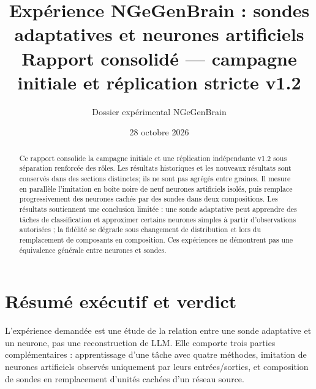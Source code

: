 \documentclass[11pt,a4paper]{article}
\title{\vspace{-1cm}\textcolor{blueNG}{\bfseries Expérience NGeGenBrain : sondes adaptatives et neurones artificiels}\\[.2em]\large Rapport consolidé — campagne initiale et réplication stricte v1.2}
\author{Dossier expérimental NGeGenBrain}
\date{28 octobre 2026}
\begin{document}
\maketitle
\begin{abstract}
Ce rapport consolide la campagne initiale et une réplication indépendante v1.2 sous séparation renforcée des rôles. Les résultats historiques et les nouveaux résultats sont conservés dans des sections distinctes; ils ne sont pas agrégés entre graines. Il mesure en parallèle l'imitation en boîte noire de neuf neurones artificiels isolés, puis remplace progressivement des neurones cachés par des sondes dans deux compositions. Les résultats soutiennent une conclusion limitée : une sonde adaptative peut apprendre des tâches de classification et approximer certains neurones simples à partir d'observations autorisées ; la fidélité se dégrade sous changement de distribution et lors du remplacement de composants en composition. Ces expériences ne démontrent pas une équivalence générale entre neurones et sondes.
\end{abstract}
\setcounter{tocdepth}{1}\tableofcontents\newpage
\section{Résumé exécutif et verdict}
L'expérience demandée est une étude de la relation entre une sonde adaptative et un neurone, pas une reconstruction de LLM. Elle comporte trois parties complémentaires : apprentissage d'une tâche avec quatre méthodes, imitation de neurones artificiels observés uniquement par leurs entrées/sorties, et composition de sondes en remplacement d'unités cachées d'un réseau source.
\end{document}
